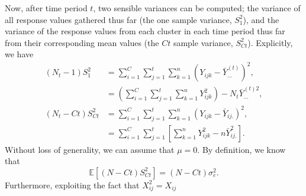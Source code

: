 \documentclass{article}
\begin{document}
Now, after time period $t$, two sensible variances can be computed; the variance of all response values gathered thus far (the one sample variance, $S_1^2$), and the variance of the response values from each cluster in each time period thus far from their corresponding mean values (the $Ct$ sample variance, $S_{Ct}^2$). Explicitly, we have
\begin{align*}
(N_t-1)S_1^2 &= \sum_{i=1}^C\sum_{j=1}^t\sum_{k=1}^n\left(Y_{ijk} - \bar{Y}_{...}^{(t)} \right)^2,\nonumber\\
&= \left(\sum_{i=1}^C\sum_{j=1}^t\sum_{k=1}^nY_{ijk}^2\right) - N_t\bar{Y}_{...}^{(t)2},\\
(N_t-Ct)S_{Ct}^2 &= \sum_{i=1}^C\sum_{j=1}^t\sum_{k=1}^n\left(Y_{ijk} - \bar{Y}_{ij.} \right)^2,\nonumber\\
&= \sum_{i=1}^C\sum_{j=1}^t\left[\sum_{k=1}^n Y_{ijk}^2 - n\bar{Y}_{ij.}^2 \right].
\end{align*}
Without loss of generality, we can assume that $\mu=0$. By definition, we know that
\[ \mathbb{E}\left[(N-Ct)S_{Ct}^2\right] = (N-Ct)\sigma_e^2.\]
Furthermore, exploiting the fact that $X_{ij}^2=X_{ij}$
\end{document}
